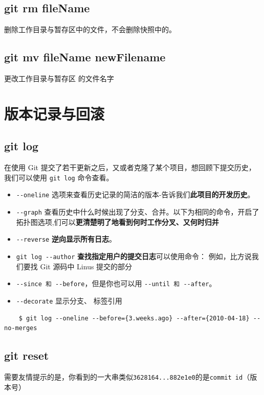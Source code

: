 \documentclass[UTF8,a4paper,12pt]{ctexbook}
\begin{document}
		\subsection{git rm fileName}
			删除工作目录与暂存区中的文件，不会删除快照中的。
			
		\subsection{git mv  fileName newFilename}
			更改工作目录与暂存区 的文件名字
			 
				
	\section{版本记录与回滚}
		\subsection{git log}
			在使用 Git 提交了若干更新之后，又或者克隆了某个项目，想回顾下提交历史，我们可以使用 \verb|git log| 命令查看。
			
			\begin{itemize}
				\item   \verb|--oneline| 选项来查看历史记录的简洁的版本-告诉我们\textbf{此项目的开发历史}。
				\item 	\verb|--graph| 查看历史中什么时候出现了分支、合并。以下为相同的命令，开启了拓扑图选项,们可以\textbf{更清楚明了地看到何时工作分叉、又何时归并}
				\item 	\verb|--reverse| \textbf{逆向显示所有日志}。
				\item  	\verb|git log --author| \textbf{查找指定用户的提交日志}可以使用命令： 例如，比方说我们要找 Git 源码中 Linus 提交的部分
				\item   \verb|--since 和 --before|，但是你也可以用 \verb|--until 和 --after|。 
				\item   \verb|--decorate| 显示分支、 标签引用
			\end{itemize}
			
			\begin{lstlisting}
	$ git log --oneline --before={3.weeks.ago} --after={2010-04-18} --no-merges
			\end{lstlisting}
			
		\subsection{git reset}
			需要友情提示的是，你看到的一大串类似\verb|3628164...882e1e0|的是\verb|commit id|（版本号）
			
\end{document}
